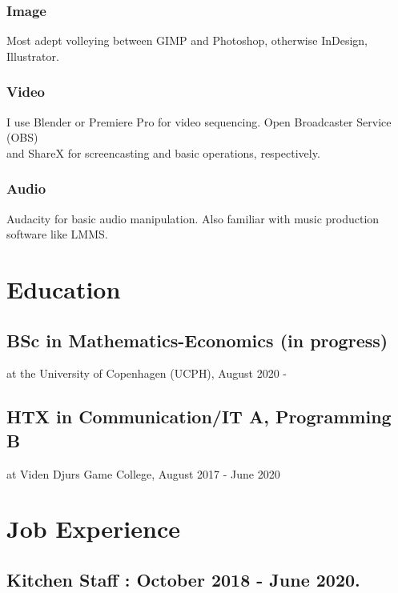 \documentclass[12]{article}
\begin{document}
\subsubsection{Image}

Most adept volleying between GIMP and Photoshop, otherwise InDesign, Illustrator.

\subsubsection{Video}

I use Blender or Premiere Pro for video sequencing. Open Broadcaster Service (OBS) \\ and ShareX for screencasting and basic operations, respectively.

\subsubsection{Audio}

Audacity for basic audio manipulation. Also familiar with music production software like LMMS.

\section{Education}

\subsection{BSc in  Mathematics-Economics (in progress)}

at the University of Copenhagen (UCPH), August 2020 - 

\subsection{HTX in Communication/IT A, Programming B}
at Viden Djurs Game College, August 2017 - June 2020

\section{Job Experience}

\subsection{Kitchen Staff : October 2018 - June 2020.}
\end{document}
